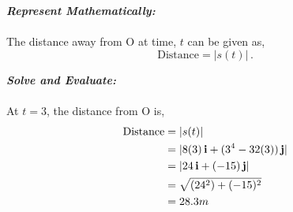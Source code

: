\begin{subquestions}
\begin{subsubquestions}
\textbf{\textit{Represent Mathematically:}} \\ \\
The distance away from O at time, $t$ can be given as,
\begin{equation}
	\text{Distance} = |s(t)| \,.
\end{equation}




\textbf{\textit{Solve and Evaluate:}} \\ \\
At $t=3$, the distance from O is,
\begin{align}
	\text{Distance} & = |s(t)| \nonumber \\
	                & = |8(3)\,\mathbf{i} + (3^4-32(3))\,\mathbf{j}| \nonumber \\
	                & = |24\,\mathbf{i} + (-15)\,\mathbf{j}| \nonumber \\
	                & = \sqrt{(24^2)+(-15)^2} \nonumber \\
	                & = 28.3m
\end{align}




 
	
	
	
	
	
	
\end{subsubquestions}












	

	
	
	
\end{subquestions}









